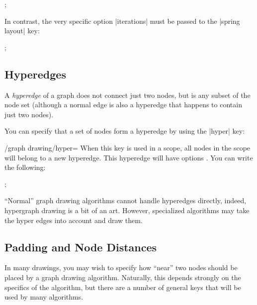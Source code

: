 \begin{codeexample}[]
\tikz {};  
\end{codeexample}

In contrast, the very specific option |iterations| must be
passed to the |spring layout| key:

\begin{codeexample}[]
\tikz {};  
\end{codeexample}



\subsection{Hyperedges}

A \emph{hyperedge} of a graph does not connect just two nodes, but is
any subset of the node set (although a normal edge is also a hyperedge
that happens to contain just two nodes).

You can specify that a set of nodes form a hyperedge by using the
|hyper| key:

\begin{key}{/graph drawing/hyper=}
  When this key is used in a scope, all nodes in the scope will belong
  to a new hyperedge. This hyperedge will have options
  . You can write the following:
\begin{codeexample}
;    
\end{codeexample}
  ``Normal'' graph drawing algorithms cannot handle hyperedges
  directly, indeed, hypergraph drawing is a bit of an art. However,
  specialized algorithms may take the hyper edges into account and
  draw them.
\end{key}



\subsection{Padding and Node Distances}

\label{subsection-gd-dist-pad}

In many drawings, you may wish to specify how ``near'' two nodes should
be placed by a graph drawing algorithm. Naturally, this depends
strongly on the specifics of the algorithm, but there are a number of
general keys that will be used by many algorithms.


